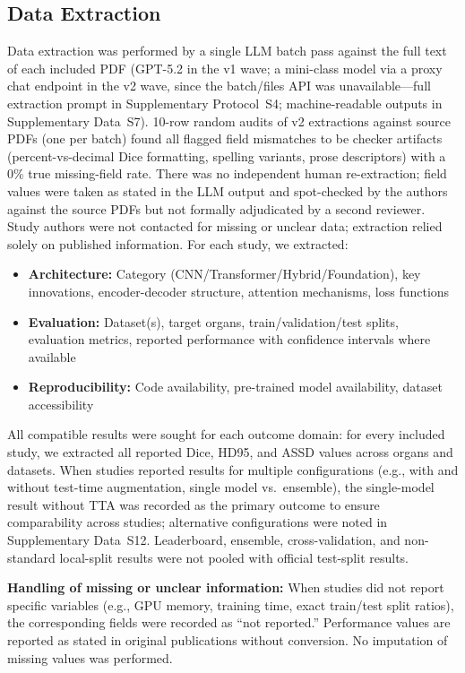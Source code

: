 \subsection{Data Extraction}

Data extraction was performed by a single LLM batch pass against the full text of each included PDF (GPT-5.2 in the v1 wave; a mini-class model via a proxy chat endpoint in the v2 wave, since the batch/files API was unavailable---full extraction prompt in Supplementary Protocol~S4; machine-readable outputs in Supplementary Data~S7). 10-row random audits of v2 extractions against source PDFs (one per batch) found all flagged field mismatches to be checker artifacts (percent-vs-decimal Dice formatting, spelling variants, prose descriptors) with a 0\% true missing-field rate. There was no independent human re-extraction; field values were taken as stated in the LLM output and spot-checked by the authors against the source PDFs but not formally adjudicated by a second reviewer. Study authors were not contacted for missing or unclear data; extraction relied solely on published information. For each study, we extracted:

\begin{itemize}
    \item \textbf{Architecture:} Category (CNN/Transformer/Hybrid/Foundation), key innovations, encoder-decoder structure, attention mechanisms, loss functions
    \item \textbf{Evaluation:} Dataset(s), target organs, train/validation/test splits, evaluation metrics, reported performance with confidence intervals where available
    \item \textbf{Reproducibility:} Code availability, pre-trained model availability, dataset accessibility
\end{itemize}

All compatible results were sought for each outcome domain: for every included study, we extracted all reported Dice, HD95, and ASSD values across organs and datasets. When studies reported results for multiple configurations (e.g., with and without test-time augmentation, single model vs.\ ensemble), the single-model result without TTA was recorded as the primary outcome to ensure comparability across studies; alternative configurations were noted in Supplementary Data~S12. Leaderboard, ensemble, cross-validation, and non-standard local-split results were not pooled with official test-split results.

\textbf{Handling of missing or unclear information:} When studies did not report specific variables (e.g., GPU memory, training time, exact train/test split ratios), the corresponding fields were recorded as ``not reported.'' Performance values are reported as stated in original publications without conversion. No imputation of missing values was performed.

